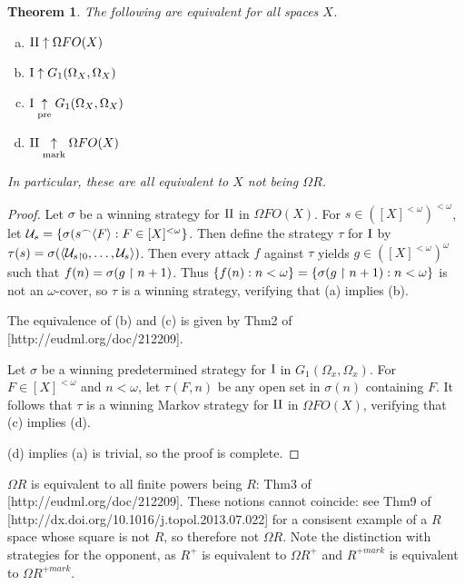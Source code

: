 \documentclass[11pt]{article}
\theoremstyle{plain}
\newtheorem{theorem}{Theorem}
\theoremstyle{definition}
\theoremstyle{remark}
\theoremstyle{plain}
\theoremstyle{definition}
\theoremstyle{remark}
\begin{document}
\begin{theorem}
The following are equivalent for all spaces \(X\).
\begin{enumerate}[a)]
\item \(\mathrm{II}\uparrow \Omega FO(X)\)
\item \(\mathrm{I}\uparrow G_1(\Omega_X,\Omega_X)\)
\item \(\mathrm{I}\underset{\text{pre}}{\uparrow} G_1(\Omega_X,\Omega_X)\)
\item \(\mathrm{II}\underset{\text{mark}}{\uparrow} \Omega FO(X)\)
\end{enumerate}
In particular, these are all equivalent to \(X\) not being \(\Omega R\).
\end{theorem}
\begin{proof}
Let \(\sigma\) be a winning strategy for \(\mathrm{II}\) in \(\Omega FO(X)\).
For \(s\in([X]^{<\omega})^{<\omega}\), let 
\(\mathcal{U}_s=\{\sigma(s{^\frown}\langle F\rangle:F\in[X]^{<\omega}\}\).
Then define the strategy \(\tau\) for \(\mathrm{I}\) by 
\(\tau(s)=\sigma(\langle\mathcal{U}_{s\restriction 0},\dots,\mathcal{U}_s\rangle)\).
Then every attack \(f\) against \(\tau\) yields \(g\in([X]^{<\omega})^\omega\)
such that \(f(n)=\sigma(g\restriction n+1)\). Thus 
\(\{f(n):n<\omega\}=\{\sigma(g\restriction n+1):n<\omega\}\)
is not an \(\omega\)-cover, so \(\tau\) is a winning strategy,
verifying that (a) implies (b).

The equivalence of (b) and (c) is given by Thm2 of
[http://eudml.org/doc/212209].

Let \(\sigma\) be a winning predetermined strategy for \(\mathrm{I}\)
in \(G_1(\Omega_x,\Omega_x)\). For \(F\in[X]^{<\omega}\) and
\(n<\omega\), let \(\tau(F,n)\) be any open set in \(\sigma(n)\)
containing \(F\). It follows that \(\tau\) is a winning Markov
strategy for \(\mathrm{II}\) in \(\Omega FO(X)\), verifying that
(c) implies (d).

(d) implies (a) is trivial, so the proof is complete.
\end{proof}

\(\Omega R\) is equivalent to all finite powers being \(R\):
Thm3 of [http://eudml.org/doc/212209].
These notions cannot coincide: see Thm9 of 
[http://dx.doi.org/10.1016/j.topol.2013.07.022] 
for a consisent example of a \(R\) space whose square
is not \(R\), so therefore not \(\Omega R\). 
Note the distinction with strategies for the opponent, as \(R^+\) is
equivalent to \(\Omega R^+\) and \(R^{+mark}\) is
equivalent to \(\Omega R^{+mark}\).
\end{document}
